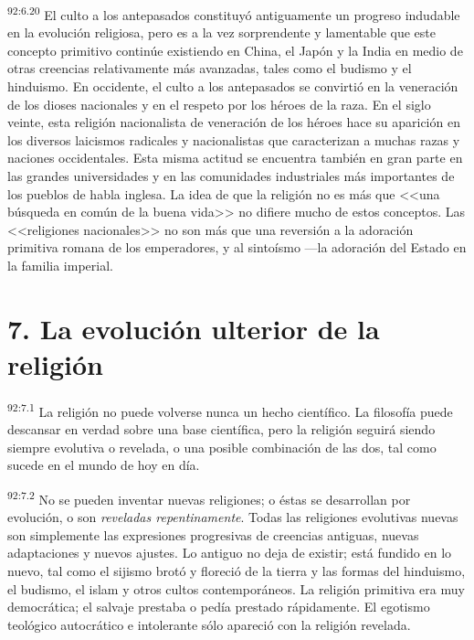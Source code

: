 \documentclass[twoside, 11pt]{book}
\begin{document}
\par
\textsuperscript{92:6.20} El culto a los antepasados constituyó antiguamente un progreso indudable en la evolución religiosa, pero es a la vez sorprendente y lamentable que este concepto primitivo continúe existiendo en China, el Japón y la India en medio de otras creencias relativamente más avanzadas, tales como el budismo y el hinduismo. En occidente, el culto a los antepasados se convirtió en la veneración de los dioses nacionales y en el respeto por los héroes de la raza. En el siglo veinte, esta religión nacionalista de veneración de los héroes hace su aparición en los diversos laicismos radicales y nacionalistas que caracterizan a muchas razas y naciones occidentales. Esta misma actitud se encuentra también en gran parte en las grandes universidades y en las comunidades industriales más importantes de los pueblos de habla inglesa. La idea de que la religión no es más que <<una búsqueda en común de la buena vida>> no difiere mucho de estos conceptos. Las <<religiones nacionales>> no son más que una reversión a la adoración primitiva romana de los emperadores, y al sintoísmo ---la adoración del Estado en la familia imperial.

\section*{7. La evolución ulterior de la religión}
\par
\textsuperscript{92:7.1} La religión no puede volverse nunca un hecho científico. La filosofía puede descansar en verdad sobre una base científica, pero la religión seguirá siendo siempre evolutiva o revelada, o una posible combinación de las dos, tal como sucede en el mundo de hoy en día.

\par
\textsuperscript{92:7.2} No se pueden inventar nuevas religiones; o éstas se desarrollan por evolución, o son \textit{reveladas repentinamente}. Todas las religiones evolutivas nuevas son simplemente las expresiones progresivas de creencias antiguas, nuevas adaptaciones y nuevos ajustes. Lo antiguo no deja de existir; está fundido en lo nuevo, tal como el sijismo brotó y floreció de la tierra y las formas del hinduismo, el budismo, el islam y otros cultos contemporáneos. La religión primitiva era muy democrática; el salvaje prestaba o pedía prestado rápidamente. El egotismo teológico autocrático e intolerante sólo apareció con la religión revelada.
\end{document}
